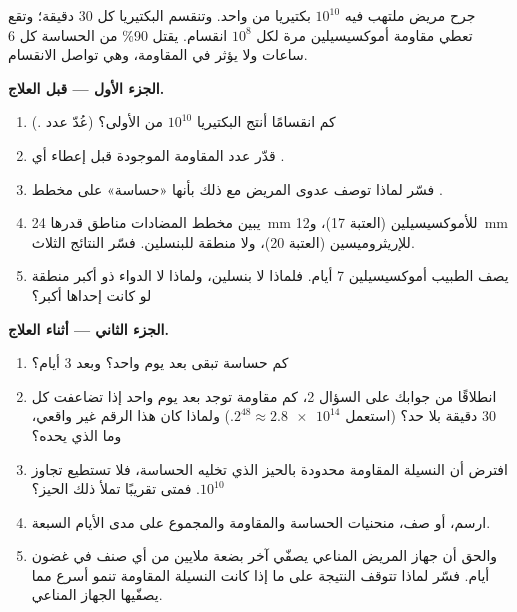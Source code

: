 \begin{problem}
\label{pb:g11:antibiotic-resistance:1}
جرح مريض ملتهب فيه $10^{10}$ بكتيريا من  واحد. وتنقسم البكتيريا كل 30
دقيقة؛ وتقع  تعطي مقاومة  أموكسيسيلين مرة لكل $10^8$
انقسام.  يقتل 90\% من  الحساسة كل 6 ساعات ولا
يؤثر في  المقاومة، وهي تواصل الانقسام.

\medskip
\noindent\textbf{الجزء الأول --- قبل العلاج.}
\begin{enumerate}
  \item كم انقسامًا أنتج البكتيريا $10^{10}$ من  الأولى؟ (عُدّ
        عدد .)
  \item قدّر عدد  المقاومة الموجودة قبل إعطاء أي .
  \item فسّر لماذا توصف عدوى المريض مع ذلك بأنها «حساسة» على مخطط
        .
  \item يبين مخطط المضادات مناطق قدرها \qty{24}{mm} للأموكسيسيلين
        (العتبة 17)، و\qty{12}{mm} للإريثروميسين (العتبة 20)، ولا
        منطقة للبنسلين. فسّر النتائج الثلاث.
  \item يصف الطبيب أموكسيسيلين 7 أيام. فلماذا لا بنسلين، ولماذا لا
        الدواء ذو أكبر منطقة لو كانت إحداها أكبر؟
\end{enumerate}

\medskip
\noindent\textbf{الجزء الثاني --- أثناء العلاج.}
\begin{enumerate}[resume]
  \item كم  حساسة تبقى بعد يوم واحد؟ وبعد 3 أيام؟
  \item انطلاقًا من جوابك على السؤال 2، كم  مقاومة توجد بعد يوم
        واحد إذا تضاعفت كل 30 دقيقة بلا حد؟ (استعمل
        $2^{48} \approx \num{2.8e14}$.) ولماذا كان هذا الرقم غير
        واقعي، وما الذي يحده؟
  \item افترض أن النسيلة المقاومة محدودة بالحيز الذي تخليه 
        الحساسة، فلا تستطيع تجاوز $10^{10}$. فمتى تقريبًا تملأ ذلك
        الحيز؟
  \item ارسم، أو صف، منحنيات  الحساسة والمقاومة والمجموع على
        مدى الأيام السبعة.
  \item والحق أن جهاز المريض المناعي يصفّي آخر بضعة ملايين  من أي
        صنف في غضون أيام. فسّر لماذا تتوقف النتيجة على ما إذا كانت
        النسيلة المقاومة تنمو أسرع مما يصفّيها الجهاز المناعي.
\end{enumerate}


\end{problem}
